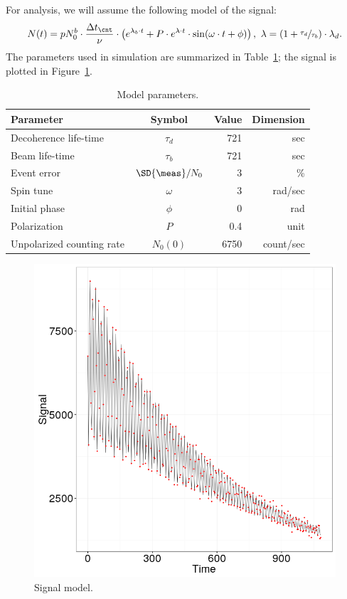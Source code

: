 \documentclass{article}
\newcommand{\dt}{\Delta t}
\newcommand{\dtc}{\dt_{\cnt}}
\newcommand{\LTb}{\tau_b}
\newcommand{\LTd}{\tau_d}
\newcommand{\lamb}{\lambda_b}
\newcommand{\lamd}{\lambda_d}
\begin{document}
For analysis, we will assume the following model of the signal:
\begin{equation}
	N(t) = pN_0^b\cdot\frac{\dtc}{\nu}\cdot\bkt{e^{\lamb\cdot t} + P\cdot e^{\lambda\cdot t}\cdot\sin(\omega\cdot t + \phi)}, ~ \lambda = (1+\sfrac{\LTd}{\LTb})\cdot \lamd.
\end{equation}
The parameters used in simulation are summarized in Table~\ref{tbl:ModParam}; the signal is plotted in Figure~\ref{fig:SignalModel}.
\begin{table}[h]
	\centering
	\caption{Model parameters.\label{tbl:ModParam}}
	\begin{tabular}{p{2.5cm}crr}
		\hline
		Parameter                 &      Symbol      & Value & Dimension \\ \hline
		Decoherence life-time     &      $\LTd$      &   721 &       sec \\
		Beam life-time            &      $\LTb$      &   721 &       sec \\
		Event error               & $\SD{\meas}/N_0$ &     3 &        \% \\
		Spin tune                 &     $\omega$     &     3 &   rad/sec \\
		Initial phase             &      $\phi$      &     0 &       rad \\
		Polarization              &       $P$        &   0.4 &      unit \\
		Unpolarized counting rate &     $N_0(0)$     &  6750 & count/sec \\ \hline
	\end{tabular}
\end{table}

\begin{figure}[h]
	\centering
	\includegraphics[scale=.8]{img/StatReq/Signal_model}
	\caption{Signal model.\label{fig:SignalModel}}
\end{figure}
\end{document}
